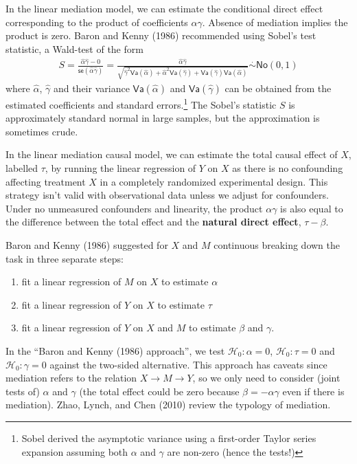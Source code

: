 \documentclass[
  11pt,
  letterpaper,
]{scrbook}
\providecommand{\tightlist}{%
  \setlength{\itemsep}{0pt}\setlength{\parskip}{0pt}}\usepackage{longtable,booktabs,array}
\theoremstyle{definition}
\theoremstyle{remark}
\begin{document}
In the linear mediation model, we can estimate the conditional direct
effect corresponding to the product of coefficients \(\alpha\gamma\).
Absence of mediation implies the product is zero. Baron and Kenny (1986)
recommended using Sobel's test statistic, a Wald-test of the form
\begin{align*}
S  = \frac{\widehat{\alpha}\widehat{\gamma} - 0}{\mathsf{se}(\widehat{\alpha}\widehat{\gamma})} =  \frac{\widehat{\alpha}\widehat{\gamma}}{\sqrt{\widehat{\gamma}^2\mathsf{Va}(\widehat{\alpha}) + \widehat{\alpha}^2\mathsf{Va}(\widehat{\gamma}) + \mathsf{Va}(\widehat{\gamma})\mathsf{Va}(\widehat{\alpha})}} \stackrel{\cdot}{\sim}\mathsf{No}(0,1)
\end{align*} where \(\widehat{\alpha}\), \(\widehat{\gamma}\) and their
variance \(\mathsf{Va}(\widehat{\alpha})\) and
\(\mathsf{Va}(\widehat{\gamma})\) can be obtained from the estimated
coefficients and standard errors.\footnote{Sobel derived the asymptotic
  variance using a first-order Taylor series expansion assuming both
  \(\alpha\) and \(\gamma\) are non-zero (hence the tests!)} The Sobel's
statistic \(S\) is approximately standard normal in large samples, but
the approximation is sometimes crude.

In the linear mediation causal model, we can estimate the total causal
effect of \(X\), labelled \(\tau\), by running the linear regression of
\(Y\) on \(X\) as there is no confounding affecting treatment \(X\) in a
completely randomized experimental design. This strategy isn't valid
with observational data unless we adjust for confounders. Under no
unmeasured confounders and linearity, the product \(\alpha\gamma\) is
also equal to the difference between the total effect and the
\textbf{natural direct effect}, \(\tau - \beta\).

Baron and Kenny (1986) suggested for \(X\) and \(M\) continuous breaking
down the task in three separate steps:

\begin{enumerate}
\def\labelenumi{\arabic{enumi})}
\tightlist
\item
  fit a linear regression of \(M\) on \(X\) to estimate \(\alpha\)
\item
  fit a linear regression of \(Y\) on \(X\) to estimate \(\tau\)
\item
  fit a linear regression of \(Y\) on \(X\) and \(M\) to estimate
  \(\beta\) and \(\gamma\).
\end{enumerate}

In the ``Baron and Kenny (1986) approach'', we test
\(\mathscr{H}_0: \alpha=0\), \(\mathscr{H}_0: \tau=0\) and
\(\mathscr{H}_0: \gamma=0\) against the two-sided alternative. This
approach has caveats since mediation refers to the relation
\(X \to M \to Y\), so we only need to consider (joint tests of)
\(\alpha\) and \(\gamma\) (the total effect could be zero because
\(\beta = -\alpha\gamma\) even if there is mediation). Zhao, Lynch, and
Chen (2010) review the typology of mediation.
\end{document}
